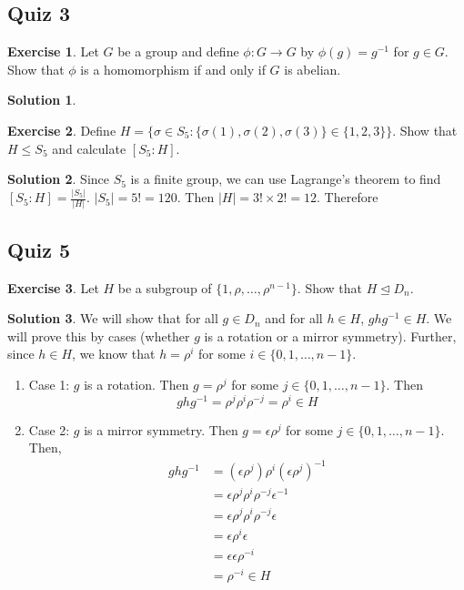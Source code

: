 \documentclass[12pt]{article}
\theoremstyle{definition}
\newcommand{\e}{\epsilon}
\newtheorem{exercise}{\color{YellowOrange}Exercise}
\theoremstyle{definition}
\newtheorem{solution}{\color{Goldenrod}Solution}
\begin{document}
\subsection{Quiz 3}
\begin{exercise}
Let $G$ be a group and define $\phi : G \to G$ by $\phi(g) = g^{-1}$ for $g \in G$. Show that $\phi$ is a homomorphism if and only if $G$ is abelian.
\end{exercise}
\begin{solution}

\end{solution}

\begin{exercise}
Define $H = \{\sigma \in S_5 : \{\sigma(1), \sigma(2), \sigma(3) \} \in \{ 1, 2, 3 \} \}$. Show that $H \leq S_5$ and calculate $[S_5 : H]$. 
\end{exercise}
\begin{solution}

Since $S_5$ is a finite group, we can use Lagrange's theorem to find $[S_5 : H] = \frac{|S_5|}{|H|}$.  $|S_5| = 5! = 120$. Then $|H| = 3! \times 2! = 12$. Therefore 
\end{solution}

\subsection{Quiz 5}
\begin{exercise}
	Let $H$ be a subgroup of $\{1, \rho, \ldots, \rho^{n-1}\}$. Show that $H \trianglelefteq D_n$. 
\end{exercise}
\begin{solution}
	We will show that for all $g \in D_n$ and for all $h \in H$, $ghg^{-1} \in H$. We will prove this by cases (whether $g$ is a rotation or a mirror symmetry). Further, since $h \in H$, we know that $h = \rho^{i}$ for some $i \in \{0,1,\ldots, n-1\}$. 
	\begin{enumerate}
		\item Case 1: $g$ is a rotation. Then $g = \rho^j$ for some $j \in \{0,1,\ldots, n-1\}$. Then
		\begin{equation}
			ghg^{-1} = \rho^j \rho^i \rho^{-j} = \rho^i \in H
		\end{equation}
		\item Case 2: $g$ is a mirror symmetry. Then $g = \e \rho^j$ for some $j \in \{0,1,\ldots, n-1\}$. Then,
		\begin{align*}
			ghg^{-1} &= (\e \rho^j)\rho^i(\e \rho^j)^{-1} \\
			&= \e \rho^j \rho^i \rho^{-j} \e^{-1} \\
			&= \e \rho^j \rho^i \rho^{-j} \e \\
			&= \e \rho^i \e \\
			&= \e \e \rho^{-i} \\
			&= \rho^{-i} \in H \tag{since $H$ is a subgroup, contains inverses}
		\end{align*}
	\end{enumerate}
\end{solution}
\end{document}
